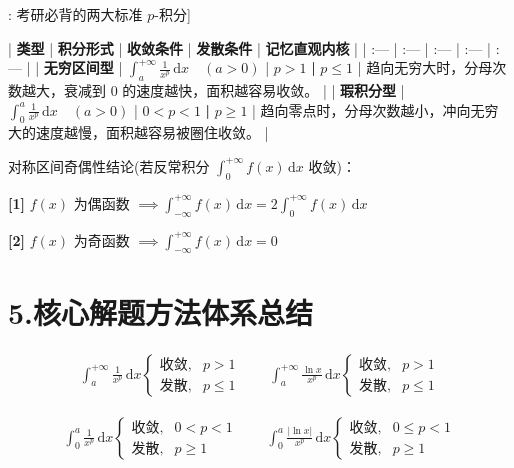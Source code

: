 \documentclass[11pt,a4paper,UTF8]{ctexart}
\begin{document}
\begin{thmbox}[定理[2]: 考研必背的两大标准 $p$-积分]

| \textbf{类型} | \textbf{积分形式} | \textbf{收敛条件} | \textbf{发散条件} | \textbf{记忆直观内核} |
| :--- | :--- | :--- | :--- | :--- |
| \textbf{无穷区间型} | $\int_a^{+\infty} \frac{1}{x^p}\,\mathrm{d}x \quad (a > 0)$ | \textit{}$p > 1$\textbf{ | }$p \leqslant 1$\textit{} | 趋向无穷大时，分母次数越大，衰减到 $0$ 的速度越快，面积越容易收敛。 |
| \textbf{瑕积分型} | $\int_0^a \frac{1}{x^p}\,\mathrm{d}x \quad (a > 0)$ | \textit{}$0 < p < 1$\textbf{ | }$p \geqslant 1$\textit{} | 趋向零点时，分母次数越小，冲向无穷大的速度越慢，面积越容易被圈住收敛。 |

对称区间奇偶性结论(若反常积分 $\int_0^{+\infty} f(x)\,\mathrm{d}x$ 收敛)：

\textbf{[1]} $f(x)$ 为偶函数 $\implies \int_{-\infty}^{+\infty} f(x)\,\mathrm{d}x = 2\int_0^{+\infty} f(x)\,\mathrm{d}x$

\textbf{[2]} $f(x)$ 为奇函数 $\implies \int_{-\infty}^{+\infty} f(x)\,\mathrm{d}x = 0$

\end{thmbox}

\section{5.核心解题方法体系总结}


\begin{align*}
\int_a^{+\infty} \frac{1}{x^p}\,\mathrm{d}x \begin{cases} \text{收敛}, & p > 1 \\ \text{发散}, & p \leqslant 1 \end{cases} \qquad \int_a^{+\infty} \frac{\ln x}{x^p}\,\mathrm{d}x \begin{cases} \text{收敛}, & p > 1 \\ \text{发散}, & p \leqslant 1 \end{cases}
\end{align*}

\begin{align*}
\int_0^a \frac{1}{x^p}\,\mathrm{d}x \begin{cases} \text{收敛}, & 0 < p < 1 \\ \text{发散}, & p \geqslant 1 \end{cases} \qquad \int_0^a \frac{\vert{}\ln x\vert{}}{x^p}\,\mathrm{d}x \begin{cases} \text{收敛}, & 0 \leqslant p < 1 \\ \text{发散}, & p \geqslant 1 \end{cases}
\end{align*}
\end{document}
